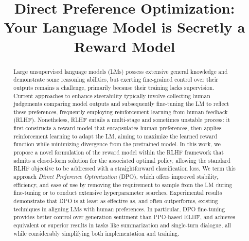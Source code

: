 \title{Direct Preference Optimization: Your Language Model is Secretly a Reward Model}

\begin{abstract}
Large unsupervised language models (LMs) possess extensive general knowledge and demonstrate some reasoning abilities, but exerting fine-grained control over their outputs remains a challenge, primarily because their training lacks supervision. Current approaches to enhance steerability typically involve collecting human judgements comparing model outputs and subsequently fine-tuning the LM to reflect these preferences, frequently employing reinforcement learning from human feedback (RLHF). Nonetheless, RLHF entails a multi-stage and sometimes unstable process: it first constructs a reward model that encapsulates human preferences, then applies reinforcement learning to adapt the LM, aiming to maximize the learned reward function while minimizing divergence from the pretrained model. In this work, we propose a novel formulation of the reward model within the RLHF framework that admits a closed-form solution for the associated optimal policy, allowing the standard RLHF objective to be addressed with a straightforward classification loss. We term this approach \textit{Direct Preference Optimization} (DPO), which offers improved stability, efficiency, and ease of use by removing the requirement to sample from the LM during fine-tuning or to conduct extensive hyperparameter searches. Experimental results demonstrate that DPO is at least as effective as, and often outperforms, existing techniques in aligning LMs with human preferences. In particular, DPO fine-tuning provides better control over generation sentiment than PPO-based RLHF, and achieves equivalent or superior results in tasks like summarization and single-turn dialogue, all while considerably simplifying both implementation and training. 
\end{abstract}

